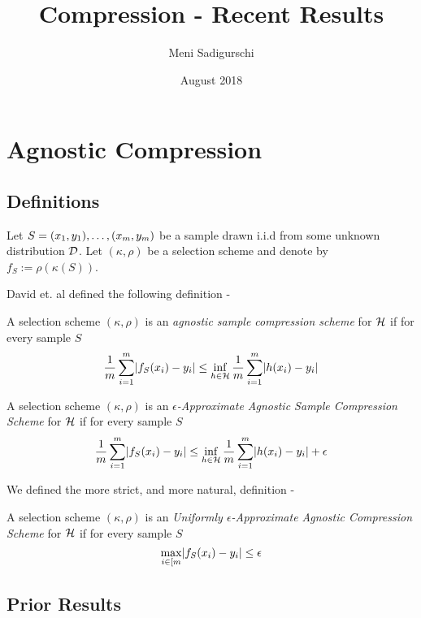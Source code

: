 \documentclass{article}
\title{Compression - Recent Results}
\author{Meni Sadigurschi}
\date{August 2018}
\begin{document}
\maketitle

\section{Agnostic Compression}
\subsection{Definitions}

Let $S = (x_1,y_1),\ldots,(x_{m},y_{m})$ be a sample drawn i.i.d from some unknown distribution $\mathcal{D}$. 
Let $(\kappa,\rho)$  be a selection scheme
and denote by $f_S := \rho(\kappa(S))$.

David et. al \cite{david2016supervised} defined the following definition -

\begin{definition}
A selection scheme $(\kappa,\rho)$ 
is an \emph{agnostic sample compression scheme} 
for $\mathcal{H}$ if for every sample $S$
\[ 
\frac{1}{m}\sum_{i=1}^{m} \lvert f_S (x_i) - y_i\rvert \leq 
\inf_{h\in\mathcal{H}} \frac{1}{m}\sum_{i=1}^{m} \lvert h (x_i) - y_i\rvert
\] 
\end{definition}

\begin{definition} \label{approx-agnos-def}
A selection scheme $(\kappa,\rho)$ 
is an \emph{$\epsilon$-Approximate Agnostic Sample Compression Scheme} for $\mathcal{H}$ 
if for every sample $S$
\[ 
\frac{1}{m}\sum_{i=1}^{m} \lvert f_S (x_i) - y_i\rvert \leq 
\inf_{h\in\mathcal{H}} \frac{1}{m}\sum_{i=1}^{m} \lvert h (x_i) - y_i\rvert + \epsilon
\] 
\end{definition}

We defined the more strict, and more natural, definition -

\begin{definition}
A selection scheme $(\kappa,\rho)$ 
is an \emph{Uniformly $\epsilon$-Approximate Agnostic Compression Scheme} for $\mathcal{H}$ 
if for every sample $S$
\[ \max_{i\in [m} \lvert f_S (x_i) - y_i\rvert \leq \epsilon \]
\end{definition}

\subsection{Prior Results}
\end{document}
